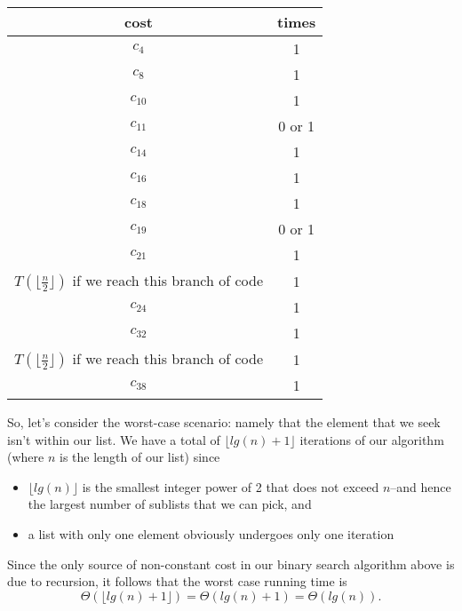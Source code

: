 \documentclass{article}
\begin{document}
\begin{tabular}{|c|c|}
\hline 
cost & times \\ 
\hline 
$c_4$ & 1 \\ 
\hline 
$c_8$ & 1 \\ 
\hline 
$c_{10}$ & 1 \\ 
\hline 
$c_{11}$ & 0 or 1 \\ 
\hline 
$c_{14}$ & 1 \\ 
\hline 
$c_{16}$ & 1 \\ 
\hline 
$c_{18}$ & 1 \\ 
\hline 
$c_{19}$ & 0 or 1 \\ 
\hline 
$c_{21}$ & 1 \\ 
\hline 
$T\left(\lfloor \frac{n}{2} \rfloor\right)$ if we reach this branch of code & 1 \\ 
\hline 
$c_{24}$ & 1 \\ 
\hline 
$c_{32}$ & 1 \\ 
\hline 
$T\left(\lfloor \frac{n}{2} \rfloor\right)$ if we reach this branch of code & 1\\ 
\hline 
$c_{38}$ & 1 \\ 
\hline 
 
\end{tabular} 

\bigskip
\bigskip

So, let's consider the worst-case scenario: namely that the element that we seek isn't within our list. We have a total of $\lfloor lg(n) + 1 \rfloor$ iterations of our algorithm (where $n$ is the length of our list) since 

\begin{itemize}
\item $\lfloor lg(n) \rfloor$ is the smallest integer power of 2 that does not exceed $n$--and hence the largest number of sublists that we can pick, and

\item a list with only one element obviously undergoes only one iteration
\end{itemize}

Since the only source of non-constant cost in our binary search algorithm above is due to recursion, it follows that the worst case running time is
\[
	\Theta\left(\lfloor lg(n) + 1 \rfloor\right) = \Theta(lg(n) + 1) = \Theta(lg(n)).
\]
\end{document}
